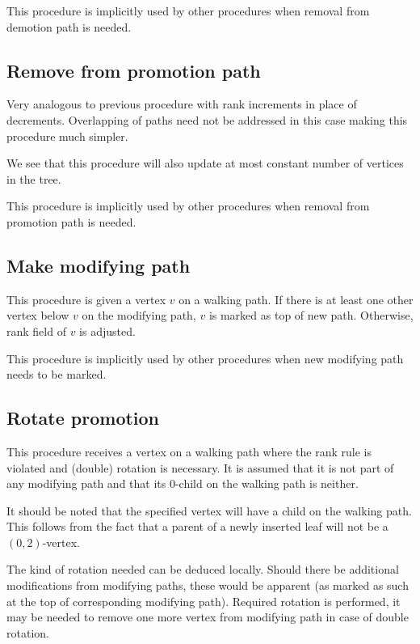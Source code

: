 This procedure is implicitly used by other procedures when removal from demotion path is needed.


\subsection{Remove from promotion path}

Very analogous to previous procedure with rank increments in place of decrements. Overlapping of paths need not be addressed in this case making this procedure much simpler.

We see that this procedure will also update at most constant number of vertices in the tree.

This procedure is implicitly used by other procedures when removal from promotion path is needed.

\subsection{Make modifying path}

This procedure is given a vertex $v$ on a walking path. If there is at least one other vertex below $v$ on the modifying path, $v$ is marked as top of new path. Otherwise, rank field of $v$ is adjusted. 

This procedure is implicitly used by other procedures when new modifying path needs to be marked.

\subsection{Rotate promotion}

This procedure receives a vertex on a walking path where the rank rule is violated and (double) rotation is necessary. It is assumed that it is not part of any modifying path and that its $0$-child on the walking path is neither. 

It should be noted that the specified vertex will have a child on the walking path. This follows from the fact that a parent of a newly inserted leaf will not be a $(0,2)$-vertex.

The kind of rotation needed can be deduced locally. Should there be additional modifications from modifying paths, these would be apparent (as marked as such at the top of corresponding modifying path). Required rotation is performed, it may be needed to remove one more vertex from modifying path in case of double rotation.

